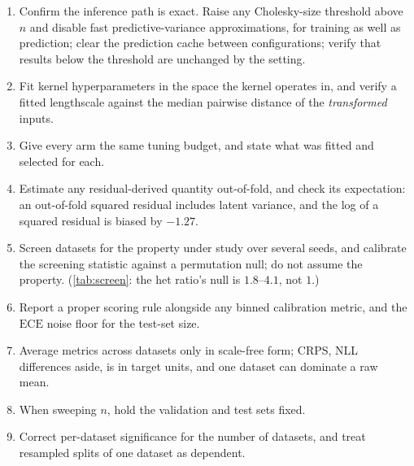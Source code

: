 \documentclass[11pt]{article}
\newcommand{\ece}{\mathrm{ECE}}
\begin{document}
\begin{enumerate}
\item Confirm the inference path is exact. Raise any Cholesky-size threshold above $n$
and disable fast predictive-variance approximations, for training as well as
prediction; clear the prediction cache between configurations; verify that results
below the threshold are unchanged by the setting.
\item Fit kernel hyperparameters in the space the kernel operates in, and verify a
fitted lengthscale against the median pairwise distance of the \emph{transformed}
inputs.
\item Give every arm the same tuning budget, and state what was fitted and selected
for each.
\item Estimate any residual-derived quantity out-of-fold, and check its expectation:
an out-of-fold squared residual includes latent variance, and the log of a squared
residual is biased by $-1.27$.
\item Screen datasets for the property under study over several seeds, and calibrate
the screening statistic against a permutation null; do not assume the property.
(\cref{tab:screen}: the het ratio's null is $1.8$--$4.1$, not $1$.)
\item Report a proper scoring rule alongside any binned calibration metric, and the
$\ece$ noise floor for the test-set size.
\item Average metrics across datasets only in scale-free form; CRPS, NLL differences
aside, is in target units, and one dataset can dominate a raw mean.
\item When sweeping $n$, hold the validation and test sets fixed.
\item Correct per-dataset significance for the number of datasets, and treat resampled
splits of one dataset as dependent.
\end{enumerate}

\FloatBarrier
\end{document}
